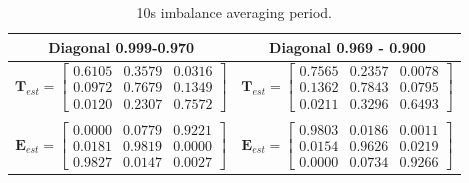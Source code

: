 \documentclass[12pt]{article}
\newcommand\mat[1]{\boldsymbol{#1}}
\begin{document}
\begin{table}[H]
\small
\centering
\caption{10s imbalance averaging period.}%
\vspace*{2.5mm}
\begin{tabularx}{0.72 \textwidth}{c|c}
\hline
Diagonal 0.999-0.970 & Diagonal 0.969 - 0.900 \\
\hline\hline
$\mat{T}_{est} = \begin{bmatrix}
    0.6105 &   0.3579  &  0.0316 \\
    0.0972 &   0.7679  &  0.1349 \\
    0.0120 &   0.2307  &  0.7572 
\end{bmatrix}$
&
$\mat{T}_{est} = \begin{bmatrix}
    0.7565 &   0.2357  &  0.0078 \\
    0.1362 &   0.7843  &  0.0795 \\
    0.0211 &   0.3296  &  0.6493 
\end{bmatrix}$ 
\\
\phantom{0} & 
\\
$\mat{E}_{est} = \begin{bmatrix}
    0.0000 &   0.0779  &  0.9221 \\
    0.0181 &   0.9819  &  0.0000 \\
    0.9827 &   0.0147  &  0.0027 
\end{bmatrix}$
&
$\mat{E}_{est} = \begin{bmatrix}
    0.9803 &   0.0186  &  0.0011 \\
    0.0154 &   0.9626  &  0.0219 \\
    0.0000 &   0.0734  &  0.9266 
\end{bmatrix}$  \\
\hline 
\end{tabularx}
\end{table}
\end{document}

